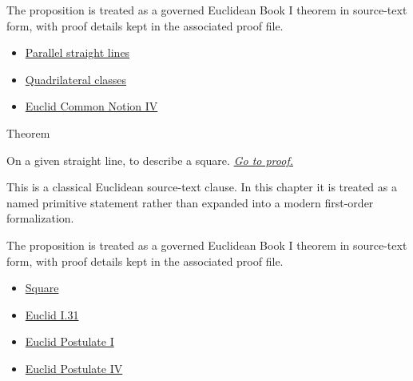 \begin{remark*}[Interpretation]
The proposition is treated as a governed Euclidean Book I theorem in source-text
form, with proof details kept in the associated proof file.
\end{remark*}
\begin{lra-not-visible}
\begin{dependencies}
\begin{itemize}
  \item \hyperref[def:euclid-parallel-straight-lines]{Parallel straight lines}
  \item \hyperref[def:euclid-quadrilateral-classes]{Quadrilateral classes}
  \item \hyperref[ax:euclid-common-notion-coinciding-things-equal]{Euclid Common Notion IV}
\end{itemize}
\end{dependencies}
\end{lra-not-visible}

\begin{theorembox}{Theorem}
\begin{theorem}
\label{thm:euclid-i-46}
On a given straight line, to describe a square.
\hyperref[prf:euclid-i-46]{\textit{Go to proof.}}
\end{theorem}
\end{theorembox}

\begin{remark*}
This is a classical Euclidean source-text clause. In this chapter it is treated
as a named primitive statement rather than expanded into a modern first-order
formalization.
\end{remark*}

\begin{remark*}[Interpretation]
The proposition is treated as a governed Euclidean Book I theorem in source-text
form, with proof details kept in the associated proof file.
\end{remark*}
\begin{lra-not-visible}
\begin{dependencies}
\begin{itemize}
  \item \hyperref[def:euclid-quadrilateral-classes]{Square}
  \item \hyperref[thm:euclid-i-31]{Euclid I.31}
  \item \hyperref[ax:euclid-postulate-draw-straight-line]{Euclid Postulate I}
  \item \hyperref[ax:euclid-postulate-right-angles-equal]{Euclid Postulate IV}
\end{itemize}
\end{dependencies}
\end{lra-not-visible}

